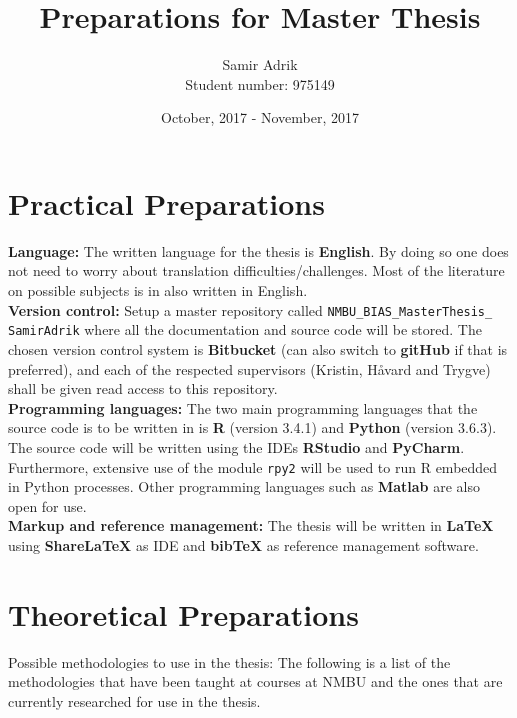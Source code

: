 \documentclass[../thesis/thesis.tex]{subfiles}
\title{\textbf{Preparations for Master Thesis}}
\author{\large Samir Adrik\\ \normalsize Student number: 975149}
\date{October, 2017 - November, 2017}
\begin{document}
\maketitle

\vspace{-1cm}\section{Practical Preparations}

\noindent \textbf{Language:} The written language for the thesis is \textbf{English}. By doing so one does not need to worry about translation difficulties/challenges. Most of the literature on possible subjects is in also written in English.\\

\noindent \textbf{Version control:} Setup a master repository called \texttt{NMBU\_BIAS\_MasterThesis\_ SamirAdrik} where all the documentation and source code will be stored. The chosen version control system is \textbf{Bitbucket} (can also switch to \textbf{gitHub} if that is preferred), and each of the respected supervisors (Kristin, Håvard and Trygve) shall be given read access to this repository.\\

\noindent \textbf{Programming languages:} The two main programming languages that the source code is to be written in is \textbf{R} (version 3.4.1) and \textbf{Python} (version 3.6.3). The source code will be written using the IDEs \textbf{RStudio} and \textbf{PyCharm}. Furthermore, extensive use of the module \texttt{rpy2} \citep{gautier2008rpy2} will be used to run R embedded in Python processes. Other programming languages such as \textbf{Matlab} are also open for use.\\

\noindent \textbf{Markup and reference management:} The thesis will be written in \textbf{\LaTeX} $\!$ using \textbf{Share\LaTeX} as IDE and \textbf{bib\TeX} as reference management software.

\section{Theoretical Preparations}

\noindent Possible methodologies to use in the thesis: The following is a list of the methodologies that have been taught at courses at NMBU and the ones that are currently researched for use in the thesis.\\
\end{document}
